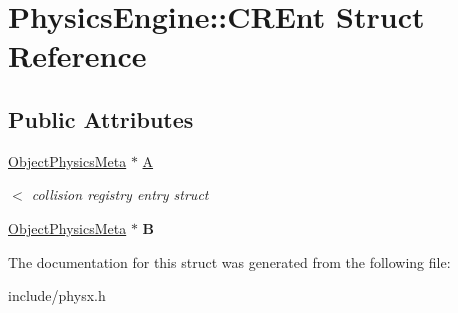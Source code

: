 \hypertarget{structPhysicsEngine_1_1CREnt}{}\section{Physics\+Engine\+:\+:C\+R\+Ent Struct Reference}
\label{structPhysicsEngine_1_1CREnt}
\subsection*{Public Attributes}
\begin{DoxyCompactItemize}
\item 
\hypertarget{structPhysicsEngine_1_1CREnt_aec2696b42ec2eb20313266df7245949d}{}\hyperlink{classObjectPhysicsMeta}{Object\+Physics\+Meta} $\ast$ \hyperlink{structPhysicsEngine_1_1CREnt_aec2696b42ec2eb20313266df7245949d}{A}\label{structPhysicsEngine_1_1CREnt_aec2696b42ec2eb20313266df7245949d}

\begin{DoxyCompactList}\small\item\em $<$ collision registry entry struct \end{DoxyCompactList}\item 
\hypertarget{structPhysicsEngine_1_1CREnt_a489aa40e4a140f2be01085b09e8e41fb}{}\hyperlink{classObjectPhysicsMeta}{Object\+Physics\+Meta} $\ast$ {\bfseries B}\label{structPhysicsEngine_1_1CREnt_a489aa40e4a140f2be01085b09e8e41fb}

\end{DoxyCompactItemize}


The documentation for this struct was generated from the following file\+:\begin{DoxyCompactItemize}
\item 
include/physx.\+h\end{DoxyCompactItemize}
